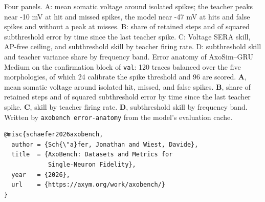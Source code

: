 \documentclass[11pt]{article}
\begin{document}

\begin{publicationhead}
\makepublicationtitle
\end{publicationhead}

  {Four panels. A: mean somatic voltage around isolated spikes; the teacher peaks near -10 mV at hit and missed spikes, the model near -47 mV at hits and false spikes and without a peak at misses. B: share of retained steps and of squared subthreshold error by time since the last teacher spike. C: Voltage SERA skill, AP-free ceiling, and subthreshold skill by teacher firing rate. D: subthreshold skill and teacher variance share by frequency band.}
  {Error anatomy of AxoSim--GRU Medium on the confirmation block of \texttt{val}: 120 traces balanced over the five morphologies, of which 24 calibrate the spike threshold and 96 are scored. \textbf{A}, mean somatic voltage around isolated hit, missed, and false spikes. \textbf{B}, share of retained steps and of squared subthreshold error by time since the last teacher spike. \textbf{C}, skill by teacher firing rate. \textbf{D}, subthreshold skill by frequency band. Written by \texttt{axobench error-anatomy} from the model's evaluation cache.}

\begin{publicationsummary}
\end{publicationsummary}

\makepublicationlinks

\begin{publicationcitation}
\begin{verbatim}
@misc{schaefer2026axobench,
  author = {Sch{\"a}fer, Jonathan and Wiest, Davide},
  title  = {AxoBench: Datasets and Metrics for
            Single-Neuron Fidelity},
  year   = {2026},
  url    = {https://axym.org/work/axobench/}
}
\end{verbatim}
\end{publicationcitation}
\end{document}
